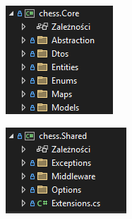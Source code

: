 \documentclass[12pt,a4paper]{article}
\begin{document}
\begin{minipage}[t]{0.45\textwidth}
    \vspace{0pt}
    \centering
    \includegraphics[width=\linewidth]{zdj/struktura_back_core.png} 
\end{minipage}
\hfill
\begin{minipage}[t]{0.45\textwidth}
    \vspace{0pt}
    \raggedright
    \lipsum[4] 
\end{minipage}

\vspace{1cm}

\begin{minipage}[t]{0.45\textwidth}
    \vspace{0pt}
    \raggedright
    \lipsum[5] 
\end{minipage}
\hfill
\begin{minipage}[t]{0.45\textwidth}
    \vspace{0pt}
    \centering
    \includegraphics[width=\linewidth]{zdj/struktura_back_shared.png} 
\end{minipage}
\end{document}
